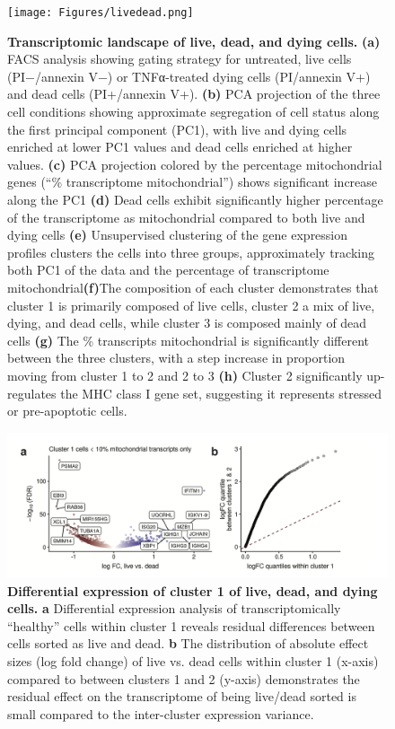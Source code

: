 \begin{figure}
	\centering
	\texttt{[image: Figures/livedead.png]}
	\caption[Transcriptomic landscape of live, dead, and dying cells.]
	{\small
	    \textbf{Transcriptomic landscape of live, dead, and dying cells.}
	    \textbf{(a)} FACS analysis showing gating strategy for untreated, live cells (PI−/annexin V−) or TNFα-treated dying cells (PI/annexin V+) and dead cells (PI+/annexin V+).
	    \textbf{(b)} PCA projection of the three cell conditions showing approximate segregation of cell status along the first principal component (PC1), with live and dying cells enriched at lower PC1 values and dead cells enriched at higher values.
	    \textbf{(c)} PCA projection colored by the percentage mitochondrial genes (“\% transcriptome mitochondrial”) shows significant increase along the PC1 \textbf{(d)} Dead cells exhibit significantly higher percentage of the transcriptome as mitochondrial compared to both live and dying cells \textbf{(e)} Unsupervised clustering of the gene expression profiles clusters the cells into three groups, approximately tracking both PC1 of the data and the percentage of transcriptome mitochondrial\textbf{(f)}The composition of each cluster demonstrates that cluster 1 is primarily composed of live cells, cluster 2 a mix of live, dying, and dead cells, while cluster 3 is composed mainly of dead cells \textbf{(g)} The \% transcripts mitochondrial is significantly different between the three clusters, with a step increase in proportion moving from cluster 1 to 2 and 2 to 3 \textbf{(h)} Cluster 2 significantly up-regulates the MHC class I gene set, suggesting it represents stressed or pre-apoptotic cells.
	}
	\label{fig:cellviability}
\end{figure}



\begin{figure}
	\centering
	\includegraphics[width=\textwidth]{Figures/livedead2.png}
	\caption[Differential expression of cluster 1 of live, dead, and dying cells.]
	{\small
	 \textbf{Differential expression of cluster 1 of live, dead, and dying cells.}
    \textbf{a} Differential expression analysis of transcriptomically ``healthy'' cells within cluster 1 reveals residual differences between cells sorted as live and dead.
    \textbf{b} The distribution of absolute effect sizes (log fold change) of live vs. dead cells within cluster 1 (x-axis) compared to between clusters 1 and 2 (y-axis) demonstrates the residual effect on the transcriptome of being live/dead sorted is small compared to the inter-cluster expression variance.	}
	\label{fig:cellviability}

\end{figure}


